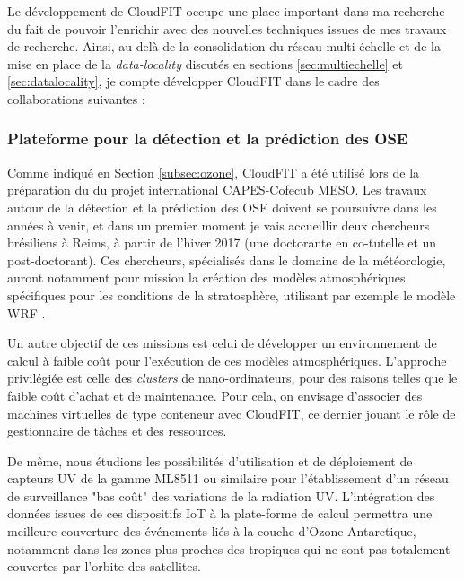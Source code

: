
Le développement de CloudFIT occupe une place important dans ma recherche du fait de pouvoir l'enrichir avec des nouvelles techniques issues de mes travaux de recherche. Ainsi, au delà de la consolidation du réseau multi-échelle et de la mise en place de la \textit{data-locality} discutés en sections \ref{sec:multiechelle} et \ref{sec:datalocality}, je compte développer CloudFIT dans le cadre des collaborations suivantes : 


\subsubsection*{Plateforme pour la détection et la prédiction des OSE}

Comme indiqué en Section \ref{subsec:ozone}, CloudFIT a été utilisé lors de la préparation du du projet international CAPES-Cofecub MESO. Les travaux autour de la détection et la prédiction des OSE doivent se poursuivre dans les années à venir, et dans un premier moment je vais accueillir deux chercheurs brésiliens à Reims, à partir de l'hiver 2017 (une doctorante en co-tutelle et un post-doctorant). Ces chercheurs, spécialisés dans le domaine de la météorologie, auront notamment pour mission la création des modèles atmosphériques spécifiques pour les conditions de la stratosphère, utilisant par exemple le modèle WRF \cite{Skamarock08a}. 

Un autre objectif de ces missions est celui de développer un environnement de calcul à faible coût pour l'exécution de ces modèles atmosphériques. L'approche privilégiée est celle des \textit{clusters} de nano-ordinateurs, pour des raisons telles que le faible coût d'achat et de maintenance. Pour cela, on envisage d'associer des machines virtuelles de type conteneur avec CloudFIT, ce dernier jouant le rôle de gestionnaire de tâches et des ressources.   

De même, nous étudions les possibilités d'utilisation et de déploiement de capteurs UV de la gamme ML8511 ou similaire pour l'établissement d'un réseau de surveillance "bas coût" des variations de la radiation UV. L'intégration des données issues de ces dispositifs IoT à la plate-forme de calcul permettra une meilleure couverture des événements liés à la couche d'Ozone Antarctique, notamment dans les zones plus proches des tropiques qui ne sont pas totalement couvertes par l'orbite des satellites.


